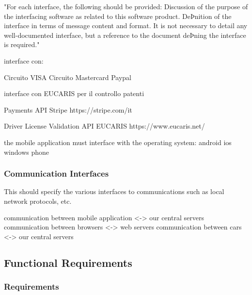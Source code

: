 \documentclass[english]{article}
\begin{document}
"For each interface, the following should be provided:
Discussion of the purpose of the interfacing software as related to this software product.
DeÞnition of the interface in terms of message content and format. It is not necessary to detail any
well-documented interface, but a reference to the document deÞning the interface is required."

interface con:

Circuito VISA
Circuito Mastercard
Paypal

interface con EUCARIS per il controllo patenti


      Payments API
      Stripe
      https://stripe.com/it

      Driver License Validation API
      EUCARIS
      https://www.eucaris.net/


the mobile application must interface with the operating system:
android
ios
windows phone



\subsubsection{Communication Interfaces}
This should specify the various interfaces to communications such as local network protocols, etc.

communication between mobile application <-> our central servers
communication between browsers <-> web servers
communication between cars <-> our central servers


\newpage
\subsection{Functional Requirements}

\subsubsection{Requirements}
\end{document}
